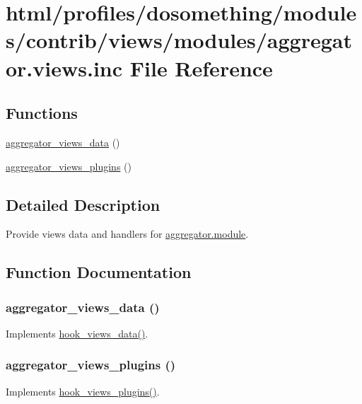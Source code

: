 \hypertarget{aggregator_8views_8inc}{
\section{html/profiles/dosomething/modules/contrib/views/modules/aggregator.views.inc File Reference}
\label{aggregator_8views_8inc}
}
\subsection*{Functions}
\begin{DoxyCompactItemize}
\item 
\hyperlink{aggregator_8views_8inc_a2a3f8960770694f1a6d3c0e2d7e24119}{aggregator\_\-views\_\-data} ()
\item 
\hyperlink{aggregator_8views_8inc_a1260b78865a34f57c44780293ea022b2}{aggregator\_\-views\_\-plugins} ()
\end{DoxyCompactItemize}


\subsection{Detailed Description}
Provide views data and handlers for \hyperlink{aggregator_8module}{aggregator.module}. 

\subsection{Function Documentation}
\hypertarget{aggregator_8views_8inc_a2a3f8960770694f1a6d3c0e2d7e24119}{
\subsubsection[{aggregator\_\-views\_\-data}]{\setlength{\rightskip}{0pt plus 5cm}aggregator\_\-views\_\-data ()}}
\label{aggregator_8views_8inc_a2a3f8960770694f1a6d3c0e2d7e24119}
Implements \hyperlink{group__views__hooks_ga227057901681e4a33e33c199c7a8c989}{hook\_\-views\_\-data()}. \hypertarget{aggregator_8views_8inc_a1260b78865a34f57c44780293ea022b2}{
\subsubsection[{aggregator\_\-views\_\-plugins}]{\setlength{\rightskip}{0pt plus 5cm}aggregator\_\-views\_\-plugins ()}}
\label{aggregator_8views_8inc_a1260b78865a34f57c44780293ea022b2}
Implements \hyperlink{group__views__hooks_ga23f6e9972b2ed84fc54b7ff63f44477d}{hook\_\-views\_\-plugins()}. 